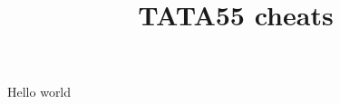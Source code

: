 \documentclass[a4paper]{article}
\title{TATA55 cheats}
\begin{document}
\maketitle

Hello world
\end{document}
